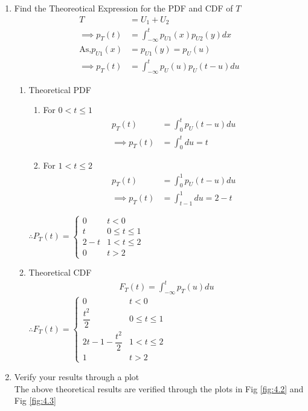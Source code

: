 \documentclass[journal,12pt,twocolumn]{IEEEtran}
\renewcommand\thesection{\arabic{section}}
\begin{document}
\begin{enumerate}[label=\thesection.\arabic*
,ref=\thesection.\theenumi]
\item Find the Theoreotical Expression for the PDF and CDF of $T$\\
\solution
\begin{align}
    T&=U_1+U_2\\
    \implies p_T(t)&=\int_{-\infty}^{t}p_{U1}(x)p_{U2}(y)dx\\
    \text{As,}p_{U1}(x)&=p_{U1}(y)=p_{U}(u)\\
    \implies p_T(t)&=\int_{-\infty}^{t}p_{U}(u)p_{U}(t-u)du
    \end{align}
    \begin{enumerate}
        \item Theoretical PDF 
        \begin{enumerate}
            \item For $0 < t\le 1$
            \begin{align}
                p_T(t)&=\int_{0}^{t}p_{U}(t-u)du\\
                \implies p_T(t)&=\int_{0}^{t} du=t
            \end{align}
            \item For $1 < t \le 2$
             \begin{align}
                p_T(t)&=\int_{0}^{1}p_{U}(t-u)du\\
                \implies p_T(t)&=\int_{t-1}^{1} du=2-t
            \end{align}
        \end{enumerate}
        $\therefore P_T(t) =
        \begin{cases}
         0     & t<0 \\
         t     &0 \le t \le 1 \\
         2-t   &1 < t \le 2\\
         0     &t>2
        \end{cases}
        $\\
        \item Theoretical CDF 
        \begin{align}
            F_T(t)=\int_{-\infty}^{t}p_T(u)du
        \end{align}
        $\therefore
            F_{T}(t)=
            \begin{cases}
             0   &t<0\\
             \dfrac{t^2}{2} &0\le t \le 1\\
             2t-1-\dfrac{t^2}{2} &1<t \le 2\\
             1 &t>2
            \end{cases}
            $\\
            \end{enumerate}
            
            \item Verify your results through a plot \\
\solution The above theoretical results are verified through the plots in
Fig \ref{fig:4.2} and Fig \ref{fig:4.3}
\end{enumerate}


		
\end{document}
